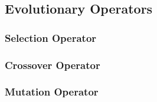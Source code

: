 \documentclass[conference]{IEEEtran}
\begin{document}
\subsection{Evolutionary Operators}
\label{sec:Algorithms:Operators}

\subsubsection{Selection Operator}
\label{sec:Algorithms:Operators:Selection}

\subsubsection{Crossover Operator}
\label{sec:Algorithms:Operators:Crossover}

\subsubsection{Mutation Operator}
\label{sec:Algorithms:Operators:Mutation}

%
%
\end{document}
